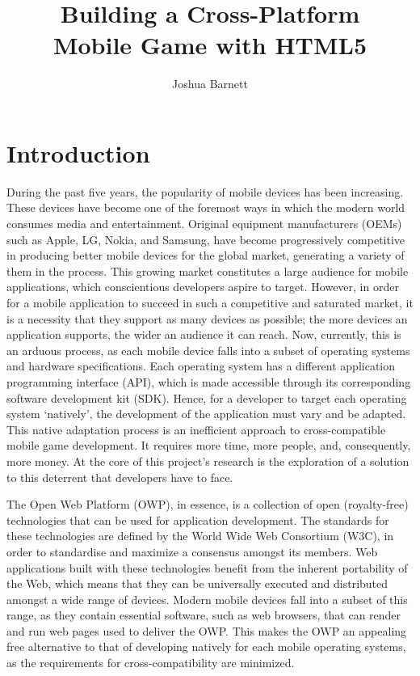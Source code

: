 \documentclass[final]{cmpreport}
\title{Building a Cross-Platform\\Mobile Game with HTML5}
\author{Joshua Barnett}
\begin{document}
\section{Introduction}
\label{sec:intro}

During the past five years, the popularity of mobile devices has been increasing. These devices have become one of the foremost ways in which the modern world consumes media and entertainment. Original equipment manufacturers (OEMs) such as Apple, LG, Nokia, and Samsung, have become progressively competitive in producing better mobile devices for the global market, generating a variety of them in the process. This growing market constitutes a large audience for mobile applications, which conscientious developers aspire to target. However, in order for a mobile application to succeed in such a competitive and saturated market, it is a necessity that they support as many devices as possible; the more devices an application supports, the wider an audience it can reach. Now, currently, this is an arduous process, as each mobile device falls into a subset of operating systems and hardware specifications. Each operating system has a different application programming interface (API), which is made accessible through its corresponding software development kit (SDK). Hence, for a developer to target each operating system `natively', the development of the application must vary and be adapted. This native adaptation process is an inefficient approach to cross-compatible mobile game development. It requires more time, more people, and, consequently, more money. At the core of this project's research is the exploration of a solution to this deterrent that developers have to face.

The Open Web Platform (OWP), in essence, is a collection of open (royalty-free) technologies that can be used for application development. The standards for these technologies are defined by the World Wide Web Consortium (W3C), in order to standardise and maximize a consensus amongst its members. Web applications built with these technologies benefit from the inherent portability of the Web, which means that they can be universally executed and distributed amongst a wide range of devices. Modern mobile devices fall into a subset of this range, as they contain essential software, such as web browsers, that can render and run web pages used to deliver the OWP. This makes the OWP an appealing free alternative to that of developing natively for each mobile operating systems, as the requirements for cross-compatibility are minimized.
\end{document}
